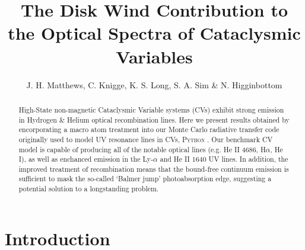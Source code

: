 \documentclass[preprint, a4paper, 11pt]{aastex}
\begin{document}

\renewcommand{\labelitemi}{$-$}
\def\la{Ly-$\alpha$ }
\def\py{\textsc{Python} }
\def\civ{C~\textsc{iv} }
\def\araa{ARAA}
\def\nat{Nature}
\def\apjl{ApJ Letters}
\def\aapr{AAPR}
\def\ssr{SSR}
\def\apj{ApJ}
\def\pasp{PASP}
\def\aap{A\&A}
\def\mnras{MNRAS}
\def\aj{AJ}
\def\rmxaa{RMXAA}

%
%


\title{The Disk Wind Contribution to the Optical Spectra of Cataclysmic Variables}
\author{J. H.
  Matthews, C. Knigge, K. S. Long, S. A. Sim \& N. Higginbottom}


%
%




\begin{abstract}
High-State non-magnetic Cataclysmic Variable systems (CVs) exhibit strong emission in Hydrogen \& Helium 
optical recombination lines. Here we present results obtained by encorporating a macro atom treatment into
our Monte Carlo radiative transfer code originally used
to model UV resonance lines in CVs, \py. Our benchmark CV model is capable of producing
all of the notable optical lines (e.g. He II 4686, H${\alpha}$, He I), as well as
enchanced emission in the Ly-$\alpha$ and He II $1640$ UV lines.
In addition, the improved treatment of recombination means that the bound-free continuum
emission is sufficient to mask the so-called `Balmer jump' photoabsorption edge, 
suggesting a potential solution to a longstanding problem. 
\end{abstract}

\maketitle



%
%

\section{Introduction} 

\end{document}
